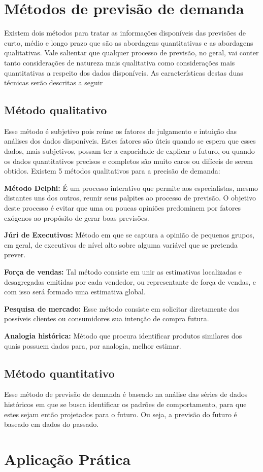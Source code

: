 \section{Métodos de previsão de demanda}

Existem dois métodos para tratar as informações disponíveis das previsões de curto, médio e longo prazo que são as abordagens quantitativas e as abordagens qualitativas. Vale salientar que qualquer processo de previsão, no geral, vai conter tanto considerações de natureza mais qualitativa como considerações mais quantitativas a respeito dos dados disponíveis. As características destas duas técnicas serão descritas a seguir

\subsection{Método qualitativo}

Esse método é subjetivo pois reúne os fatores de julgamento e intuição das análises dos dados disponíveis. Estes fatores são úteis quando se espera que esses dados, mais subjetivos, possam ter a capacidade de explicar o futuro, ou quando os dados quantitativos precisos e completos são muito caros ou difíceis de serem obtidos. Existem 5 métodos qualitativos para a precisão de demanda:

\textbf{Método Delphi:} É um processo interativo que permite aos especialistas, mesmo distantes uns dos outros, reunir seus palpites ao processo de previsão. O objetivo deste processo é evitar que uma ou poucas opiniões predominem por fatores exógenos ao propósito de gerar boas previsões.

\textbf{Júri de Executivos:} Método em que se captura a opinião de pequenos grupos, em geral, de executivos de nível alto sobre alguma variável que se pretenda prever.

\textbf{Força de vendas:} Tal método consiste em unir as estimativas localizadas e desagregadas emitidas por cada vendedor, ou representante de força de vendas, e com isso será formado uma estimativa global.

\textbf{Pesquisa de mercado:} Esse método consiste em solicitar diretamente dos possíveis clientes ou consumidores sua intenção de compra futura.

\textbf{Analogia histórica:} Método que procura identificar produtos similares dos quais possuem dados para, por analogia, melhor estimar. %

\subsection{Método quantitativo}

Esse método de previsão de demanda é baseado na análise das séries de dados históricos em que se busca identificar os padrões de comportamento, para que estes sejam então projetados para o futuro. Ou seja, a previsão do futuro é baseado em dados do passado.

\section{Aplicação Prática}
\label{sec:introducao_ao_planejamento_aplicacao}
